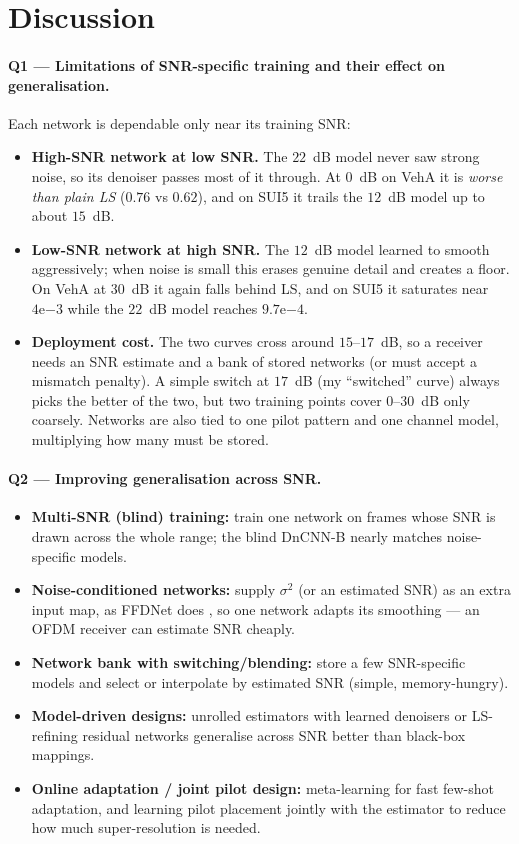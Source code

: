 \documentclass[a4paper,10pt]{article}
\begin{document}
\section{Discussion}
\paragraph{Q1 --- Limitations of SNR-specific training and their effect on
generalisation.} Each network is dependable only near its training SNR:
\begin{itemize}
\item \textbf{High-SNR network at low SNR.} The $22$~dB model never saw strong
noise, so its denoiser passes most of it through. At $0$~dB on VehA it is
\emph{worse than plain LS} ($0.76$ vs $0.62$), and on SUI5 it trails the $12$~dB
model up to about $15$~dB.
\item \textbf{Low-SNR network at high SNR.} The $12$~dB model learned to smooth
aggressively; when noise is small this erases genuine detail and creates a
floor. On VehA at $30$~dB it again falls behind LS, and on SUI5 it saturates
near $4\mathrm{e}{-3}$ while the $22$~dB model reaches $9.7\mathrm{e}{-4}$.
\item \textbf{Deployment cost.} The two curves cross around $15$--$17$~dB, so a
receiver needs an SNR estimate and a bank of stored networks (or must accept a
mismatch penalty). A simple switch at $17$~dB (my ``switched'' curve) always
picks the better of the two, but two training points cover $0$--$30$~dB only
coarsely. Networks are also tied to one pilot pattern and one channel model,
multiplying how many must be stored.
\end{itemize}

\paragraph{Q2 --- Improving generalisation across SNR.}
\begin{itemize}
\item \textbf{Multi-SNR (blind) training:} train one network on frames whose SNR
is drawn across the whole range; the blind DnCNN-B \cite{zhang2017} nearly
matches noise-specific models.
\item \textbf{Noise-conditioned networks:} supply $\sigma^2$ (or an estimated
SNR) as an extra input map, as FFDNet does \cite{zhang2018ffdnet}, so one
network adapts its smoothing --- an OFDM receiver can estimate SNR cheaply.
\item \textbf{Network bank with switching/blending:} store a few SNR-specific
models and select or interpolate by estimated SNR (simple, memory-hungry).
\item \textbf{Model-driven designs:} unrolled estimators with learned denoisers
or LS-refining residual networks generalise across SNR better than black-box
mappings.
\item \textbf{Online adaptation / joint pilot design:} meta-learning for fast
few-shot adaptation, and learning pilot placement jointly with the estimator to
reduce how much super-resolution is needed.
\end{itemize}
\end{document}
